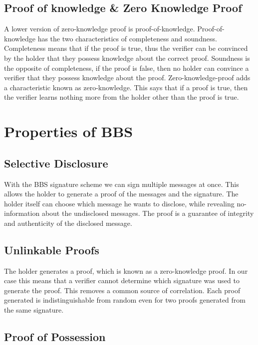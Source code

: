 \documentclass{article}
\begin{document}
\subsection{Proof of knowledge \& Zero Knowledge Proof}

A lower version of zero-knowledge proof is proof-of-knowledge. Proof-of-knowledge has the two characteristics of completeness and soundness. Completeness means that if the proof is true, thus the verifier can be convinced by the holder that they possess knowledge about the correct proof. Soundness is the opposite of completeness, if the proof is false, then no holder can convince a verifier that they possess knowledge about the proof. Zero-knowledge-proof adds a characteristic known as zero-knowledge. This says that if a proof is true, then the verifier learns nothing more from the holder other than the proof is true.

\section{Properties of BBS}

\subsection{Selective Disclosure}

With the BBS signature scheme we can sign multiple messages at once. This allows the holder to generate a proof of the messages and the signature. The holder itself can choose which message he wants to disclose, while revealing no-information about the undisclosed messages. The proof is a guarantee of integrity and authenticity of the disclosed message.

\subsection{Unlinkable Proofs}

The holder generates a proof, which is known as a zero-knowledge proof. In our case this means that a verifier cannot determine which signature was used to generate the proof. This removes a common source of correlation. Each proof generated is indistinguishable from random even for two proofs generated from the same signature. 

\subsection{Proof of Possession}
\end{document}
